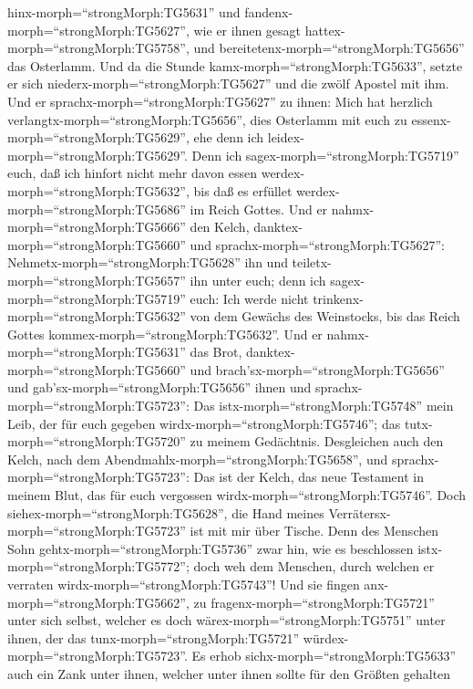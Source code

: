 hinx-morph=``strongMorph:TG5631'' und
fandenx-morph=``strongMorph:TG5627'', wie er ihnen gesagt
hattex-morph=``strongMorph:TG5758'', und
bereitetenx-morph=``strongMorph:TG5656'' das Osterlamm. 
Und da die Stunde kamx-morph=``strongMorph:TG5633'', setzte er sich
niederx-morph=``strongMorph:TG5627'' und die zwölf Apostel mit ihm.
 Und er sprachx-morph=``strongMorph:TG5627'' zu ihnen: Mich
hat herzlich verlangtx-morph=``strongMorph:TG5656'', dies Osterlamm mit
euch zu essenx-morph=``strongMorph:TG5629'', ehe denn ich
leidex-morph=``strongMorph:TG5629''.  Denn ich
sagex-morph=``strongMorph:TG5719'' euch, daß ich hinfort nicht mehr
davon essen werdex-morph=``strongMorph:TG5632'', bis daß es erfüllet
werdex-morph=``strongMorph:TG5686'' im Reich Gottes.  Und
er nahmx-morph=``strongMorph:TG5666'' den Kelch,
danktex-morph=``strongMorph:TG5660'' und
sprachx-morph=``strongMorph:TG5627'':
Nehmetx-morph=``strongMorph:TG5628'' ihn und
teiletx-morph=``strongMorph:TG5657'' ihn unter euch;  denn
ich sagex-morph=``strongMorph:TG5719'' euch: Ich werde nicht
trinkenx-morph=``strongMorph:TG5632'' von dem Gewächs des Weinstocks,
bis das Reich Gottes kommex-morph=``strongMorph:TG5632''. 
Und er nahmx-morph=``strongMorph:TG5631'' das Brot,
danktex-morph=``strongMorph:TG5660'' und
brach'sx-morph=``strongMorph:TG5656'' und
gab'sx-morph=``strongMorph:TG5656'' ihnen und
sprachx-morph=``strongMorph:TG5723'': Das
istx-morph=``strongMorph:TG5748'' mein Leib, der für euch gegeben
wirdx-morph=``strongMorph:TG5746''; das
tutx-morph=``strongMorph:TG5720'' zu meinem Gedächtnis. 
Desgleichen auch den Kelch, nach dem
Abendmahlx-morph=``strongMorph:TG5658'', und
sprachx-morph=``strongMorph:TG5723'': Das ist der Kelch, das neue
Testament in meinem Blut, das für euch vergossen
wirdx-morph=``strongMorph:TG5746''.  Doch
siehex-morph=``strongMorph:TG5628'', die Hand meines
Verrätersx-morph=``strongMorph:TG5723'' ist mit mir über Tische.
 Denn des Menschen Sohn gehtx-morph=``strongMorph:TG5736''
zwar hin, wie es beschlossen istx-morph=``strongMorph:TG5772''; doch weh
dem Menschen, durch welchen er verraten
wirdx-morph=``strongMorph:TG5743''!  Und sie fingen
anx-morph=``strongMorph:TG5662'', zu
fragenx-morph=``strongMorph:TG5721'' unter sich selbst, welcher es doch
wärex-morph=``strongMorph:TG5751'' unter ihnen, der das
tunx-morph=``strongMorph:TG5721'' würdex-morph=``strongMorph:TG5723''.
 Es erhob sichx-morph=``strongMorph:TG5633'' auch ein Zank
unter ihnen, welcher unter ihnen sollte für den Größten gehalten
